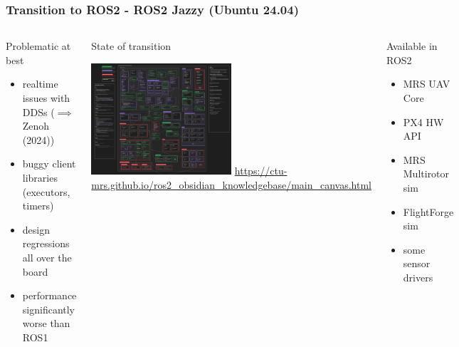 \documentclass[aspectratio=169,9pt]{beamer}
\begin{document}


\begin{frame}
  \frametitle{Transition to ROS2 - ROS2 Jazzy (Ubuntu 24.04)}

\begin{columns}[c]


\begin{block}{Problematic at best}
  \begin{itemize}
    \item realtime issues with DDSs ($\implies$ Zenoh (2024))
    \item buggy client libraries (executors, timers)
    \item design regressions all over the board
    \item performance significantly worse than ROS1
  \end{itemize}
\end{block}

\begin{block}{State of transition}
  \begin{center}
    \includegraphics[width=0.5\textwidth]{./fig/rros2_diagram.png}
    \url{https://ctu-mrs.github.io/ros2_obsidian_knowledgebase/main_canvas.html}
  \end{center}
\end{block}

\begin{block}{Available in ROS2}
  \begin{itemize}
    \item MRS UAV Core
    \item PX4 HW API
    \item MRS Multirotor sim
    \item FlightForge sim
    \item some sensor drivers
  \end{itemize}
\end{block}


\end{columns}
\end{frame}
\end{document}

